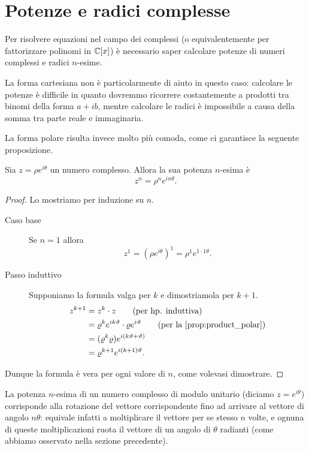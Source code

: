 \section{Potenze e radici complesse}

Per risolvere equazioni nel campo dei complessi (o equivalentemente per fattorizzare polinomi in $\mathbb{C}[x]$) è necessario saper calcolare potenze di numeri complessi e radici $n$-esime.

La forma cartesiana non è particolarmente di aiuto in questo caso: calcolare le potenze è difficile in quanto dovremmo ricorrere costantemente a prodotti tra binomi della forma $a+ib$, mentre calcolare le radici è impossibile a causa della somma tra parte reale e immaginaria.

La forma polare risulta invece molto più comoda, come ci garantisce la seguente proposizione.
\begin{proposition}\label{prop:power_complex}
    Sia $z = \rho e^{i\theta}$ un numero complesso. Allora la sua potenza $n$-esima è \begin{equation}
        z^n = \rho^n e^{in\theta}.
    \end{equation}
\end{proposition}
\begin{proof}
    Lo mostriamo per induzione su $n$.
    \begin{description}
        \item[Caso base] Se $n = 1$ allora \[
            z^1 = (\rho e^{i\theta})^1 = \rho^1 e^{1 \cdot 1\theta}.    
        \] 
        \item[Passo induttivo] Supponiamo la formula valga per $k$ e dimostriamola per $k + 1$.
        \begin{align*}
            z^{k+1} &= z^k \cdot z \tag{per hp. induttiva}\\
            &= \rho^k e^{ik\theta} \cdot \rho e^{i\theta} \tag{per la \autoref{prop:product_polar}}\\
            &= (\rho^k \rho) e^{i(k\theta+\theta)} \\
            &= \rho^{k+1} e^{i(k+1)\theta}.
        \end{align*} 
    \end{description}
    Dunque la formula è vera per ogni valore di $n$, come volevasi dimostrare.
\end{proof}

La potenza $n$-esima di un numero complesso di modulo unitario (diciamo $z = e^{i\theta}$) corrisponde alla rotazione del vettore corrispondente fino ad arrivare al vettore di angolo $n\theta$: equivale infatti a moltiplicare il vettore per se stesso $n$ volte, e ognuna di queste moltiplicazioni ruota il vettore di un angolo di $\theta$ radianti (come abbiamo osservato nella sezione precedente).

